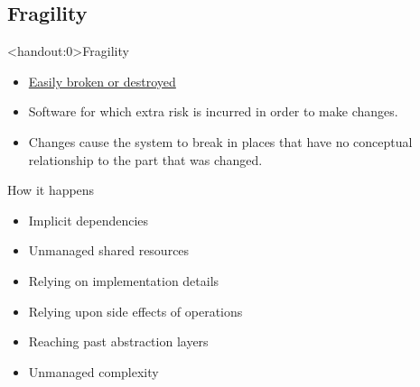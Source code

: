 \documentclass[xcolor=svgnames, handout]{beamer}
\begin{document}

\subsection{Fragility}


{%
%
\begin{frame}<handout:0>{Fragility}
\end{frame}
}

{%
%
\begin{frame}{\subsecname}

    \begin{itemize}
        \item \href{https://www.merriam-webster.com/dictionary/fragile}
            {Easily broken or destroyed} \pause
        \item Software for which extra risk is incurred in order to make
            changes. \pause
        \item Changes cause the system to break in places that have no
            conceptual relationship to the part that was changed.
    \end{itemize}
\end{frame}
}


{%
%
\begin{frame}{\subsecname}

    How it happens
    \begin{itemize}
        \pause \item Implicit dependencies
        \pause \item Unmanaged shared resources
        \pause \item Relying on implementation details
        \pause \item Relying upon side effects of operations
        \pause \item Reaching past abstraction layers
        \pause \item Unmanaged complexity
    \end{itemize}
\end{frame}
}
\end{document}
